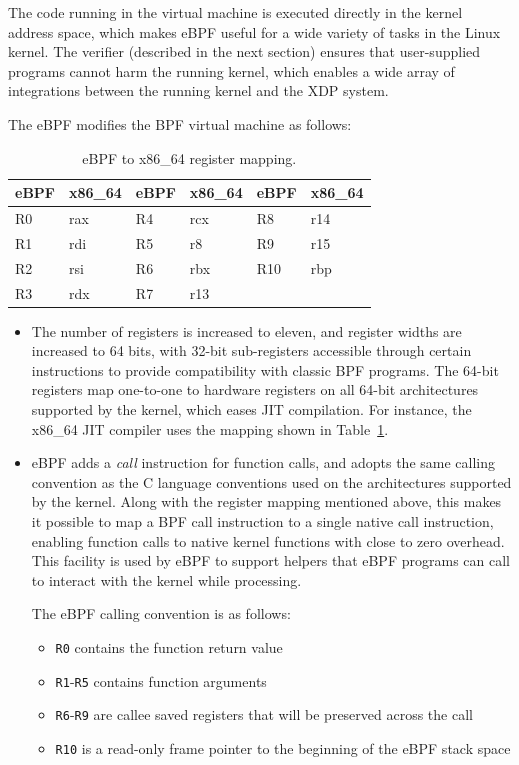 \documentclass[10pt,sigconf]{acmart}
\begin{document}
The code running in the virtual machine is executed directly in the kernel
address space, which makes eBPF useful for a wide variety of tasks in the Linux
kernel. The verifier (described in the next section) ensures that user-supplied
programs cannot harm the running kernel, which enables a wide array of
integrations between the running kernel and the XDP system.

The eBPF modifies the BPF virtual machine as follows:

\begin{table}[tbp]
\caption{\label{tbl:reg-map}
eBPF to x86\_64 register mapping.}
\centering
\begin{tabular}{ll|ll|ll}
\toprule
eBPF & x86\_64 & eBPF & x86\_64 & eBPF & x86\_64\\
\midrule
R0 & rax & R4 & rcx & R8 & r14\\
R1 & rdi & R5 & r8 &  R9 & r15\\
R2 & rsi & R6 & rbx & R10 & rbp\\
R3 & rdx & R7 & r13\\
\bottomrule
\end{tabular}
\end{table}


\begin{itemize}
\item The number of registers is increased to eleven, and register widths are
increased to 64 bits, with 32-bit sub-registers accessible through certain
instructions to provide compatibility with classic BPF programs. The 64-bit
registers map one-to-one to hardware registers on all 64-bit architectures
supported by the kernel, which eases JIT compilation. For instance, the x86\_64
JIT compiler uses the mapping shown in Table \ref{tbl:reg-map}.

\item eBPF adds a \emph{call} instruction for function calls, and adopts the same calling
convention as the C language conventions used on the architectures supported
by the kernel. Along with the register mapping mentioned above, this makes it
possible to map a BPF call instruction to a single native call instruction,
enabling function calls to native kernel functions with close to zero
overhead. This facility is used by eBPF to support helpers that eBPF programs
can call to interact with the kernel while processing.

The eBPF calling convention is as follows:
\begin{itemize}
\item \texttt{R0} contains the function return value
\item \texttt{R1}-\texttt{R5} contains function arguments
\item \texttt{R6}-\texttt{R9} are callee saved registers that will be preserved across the call
\item \texttt{R10} is a read-only frame pointer to the beginning of the eBPF stack space
\end{itemize}
\end{itemize}
\end{document}

